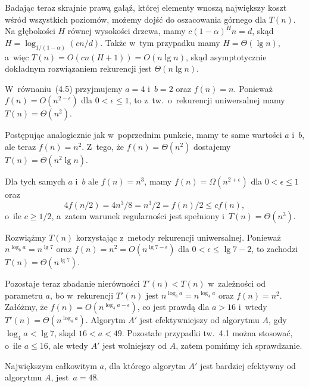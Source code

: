 Badając teraz skrajnie prawą gałąź, której elementy wnoszą największy koszt wśród wszystkich poziomów, możemy dojść do oszacowania górnego dla $T(n)$. Na głębokości $H$ równej wysokości drzewa, mamy $c(1-\alpha)^Hn=d$, skąd $H=\log_{1/(1-\alpha)}(cn/d)$. Także w~tym przypadku mamy $H=\Theta(\lg n)$, a~więc $T(n)=O(cn(H+1))=O(n\lg n)$, skąd asymptotycznie dokładnym rozwiązaniem rekurencji jest $\Theta(n\lg n)$.



\exercise %

\subexercise
W~równaniu~(4.5) przyjmujemy $a=4$ i~$b=2$ oraz $f(n)=n$. Ponieważ $f(n)=O(n^{2-\epsilon})$ dla $0<\epsilon\le1$, to z~tw.~o~rekurencji uniwersalnej mamy $T(n)=\Theta(n^2)$.

\subexercise
Postępując analogicznie jak w~poprzednim punkcie, mamy te same wartości $a$ i~$b$, ale teraz $f(n)=n^2$. Z~tego, że $f(n)=\Theta(n^2)$ dostajemy $T(n)=\Theta(n^2\lg n)$.

\subexercise
Dla tych samych $a$ i~$b$ ale $f(n)=n^3$, mamy $f(n)=\Omega(n^{2+\epsilon})$ dla $0<\epsilon\le1$ oraz
\[
	4f(n/2) = 4n^3\!/8 = n^3\!/2 = f(n)/2 \le cf(n),
\]
o~ile $c\ge1/2$, a~zatem warunek regularności jest spełniony i~$T(n)=\Theta(n^3)$.

\exercise %
Rozwiążmy $T(n)$ korzystając z~metody rekurencji uniwersalnej. Ponieważ $n^{\log_ba}=n^{\lg7}$ oraz $f(n)=n^2=O(n^{\lg7-\epsilon})$ dla $0<\epsilon\le\lg7-2$, to zachodzi $T(n)=\Theta(n^{\lg7})$.

Pozostaje teraz zbadanie nierówności $T'(n)<T(n)$ w~zależności od parametru $a$, bo w~rekurencji $T'(n)$ jest $n^{\log_ba}=n^{\log_4a}$ oraz $f(n)=n^2$. Załóżmy, że $f(n)=O(n^{\log_4a-\epsilon})$, co jest prawdą dla $a>16$ i~wtedy $T'(n)=\Theta(n^{\log_4a})$. Algorytm $A'$ jest efektywniejszy od algorytmu $A$, gdy $\log_4a<\lg7$, skąd $16<a<49$. Pozostałe przypadki tw.~4.1 można stosować, o~ile $a\le16$, ale wtedy $A'$ jest wolniejszy od $A$, zatem pomińmy ich sprawdzanie.

Największym całkowitym $a$, dla którego algorytm $A'$ jest bardziej efektywny od algorytmu $A$, jest~$a=48$.

